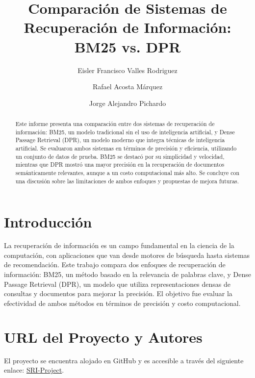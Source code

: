 \documentclass[runningheads]{llncs}
\begin{document}
\title{Comparación de Sistemas de Recuperación de Información: BM25 vs. DPR}
\author{Eisler Francisco Valles Rodriguez \and Rafael Acosta Márquez \and Jorge Alejandro Pichardo}

\maketitle

\begin{abstract}
Este informe presenta una comparación entre dos sistemas de recuperación de información: BM25, un modelo tradicional sin el uso de inteligencia artificial, y Dense Passage Retrieval (DPR), un modelo moderno que integra técnicas de inteligencia artificial. Se evaluaron ambos sistemas en términos de precisión y eficiencia, utilizando un conjunto de datos de prueba. BM25 se destacó por su simplicidad y velocidad, mientras que DPR mostró una mayor precisión en la recuperación de documentos semánticamente relevantes, aunque a un costo computacional más alto. Se concluye con una discusión sobre las limitaciones de ambos enfoques y propuestas de mejora futuras.
\end{abstract}

\section{Introducción}
La recuperación de información es un campo fundamental en la ciencia de la computación, con aplicaciones que van desde motores de búsqueda hasta sistemas de recomendación. Este trabajo compara dos enfoques de recuperación de información: BM25, un método basado en la relevancia de palabras clave, y Dense Passage Retrieval (DPR), un modelo que utiliza representaciones densas de consultas y documentos para mejorar la precisión. El objetivo fue evaluar la efectividad de ambos métodos en términos de precisión y costo computacional.

\section{URL del Proyecto y Autores}
El proyecto se encuentra alojado en GitHub y es accesible a través del siguiente enlace: \href{https://github.com/theGitNoob/SRI-Project}{SRI-Project}.
\end{document}
